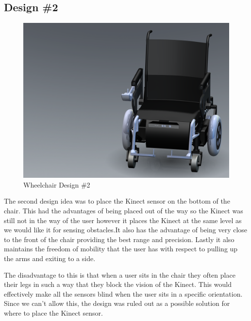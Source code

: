 \documentclass[oneside,final,a4paper]{report}
\begin{document}
\subsection{Design \#2}
\begin{figure}[hbt]
 \centering
 \includegraphics[scale=0.15]{WheelChair_2}
 \caption{Wheelchair Design \#2}
\end{figure}

The second design idea was to place the Kinect sensor on the bottom of the chair.  This had the advantages of being placed out of the way so the Kinect was still not in the way of the user however it places the Kinect at the same level as we would like it for sensing obstacles.It also has the advantage of being very close to the front of the chair providing the best range and precision. Lastly it also maintains the freedom of mobility that the user has with respect to pulling up the arms and exiting to a side.

The disadvantage to this is that when a user sits in the chair they often place their legs in such a way that they block the vision of the Kinect. This would effectively make all the sensors blind when the user sits in a specific orientation. Since we can’t allow this, the design was ruled out as a possible solution for where to place the Kinect sensor.
\end{document}
